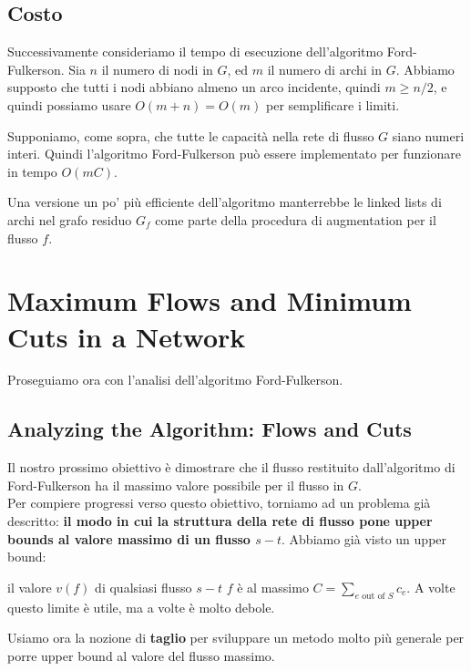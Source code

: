 \subsection{Costo}

Successivamente consideriamo il tempo di esecuzione dell'algoritmo
Ford-Fulkerson. Sia $n$ il numero di nodi in $G$, ed $m$ il numero
di archi in $G$. Abbiamo supposto che tutti i nodi abbiano almeno un
arco incidente, quindi $m \ge n/2$, e quindi possiamo usare
$O(m + n ) = O(m)$ per semplificare i limiti.

\begin{myblockquote}
	Supponiamo, come sopra, che tutte le capacità nella rete di flusso $G$
	siano numeri interi. Quindi l'algoritmo Ford-Fulkerson può essere
	implementato per funzionare in tempo $O(mC)$.
\end{myblockquote}

Una versione un po' più efficiente dell'algoritmo manterrebbe le linked
lists di archi nel grafo residuo $G_f$ come parte della procedura di
augmentation per il flusso $f$.


\section{Maximum Flows and Minimum Cuts in a Network}

Proseguiamo ora con l'analisi dell'algoritmo Ford-Fulkerson.


\subsection{Analyzing the Algorithm: Flows and Cuts}

Il nostro prossimo obiettivo è dimostrare che il flusso restituito
dall'algoritmo di Ford-Fulkerson ha il massimo valore possibile per il
flusso in $G$.\\

Per compiere progressi verso questo obiettivo, torniamo ad un problema
già descritto: \textbf{il modo in cui la struttura della rete di flusso
	pone upper bounds al valore massimo di un flusso $s-t$}. Abbiamo già
visto un upper bound:

\begin{myblockquote}
	il valore $v(f)$ di qualsiasi
	flusso $s-t$ $f$ è al massimo
	$C = \sum_{e \text{ out of } S} c_e$. A volte questo limite è utile,
	ma a volte è molto debole.
\end{myblockquote}

Usiamo ora la nozione di \textbf{taglio} per sviluppare un metodo molto
più generale per porre upper bound al valore del flusso massimo.

